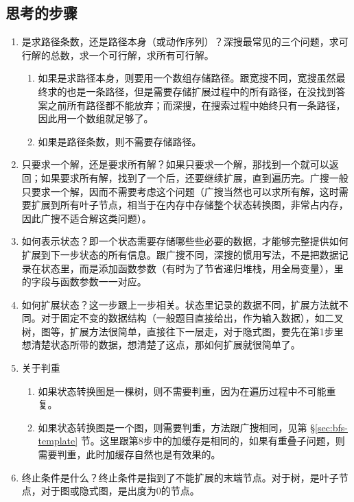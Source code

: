 \subsection{思考的步骤}
\begin{enumerate}
\item 是求路径条数，还是路径本身（或动作序列）？深搜最常见的三个问题，求可行解的总数，求一个可行解，求所有可行解。
    \begin{enumerate}
    \item 如果是求路径本身，则要用一个数组存储路径。跟宽搜不同，宽搜虽然最终求的也是一条路径，但是需要存储扩展过程中的所有路径，在没找到答案之前所有路径都不能放弃；而深搜，在搜索过程中始终只有一条路径，因此用一个数组就足够了。
    \item 如果是路径条数，则不需要存储路径。
    \end{enumerate}

\item 只要求一个解，还是要求所有解？如果只要求一个解，那找到一个就可以返回；如果要求所有解，找到了一个后，还要继续扩展，直到遍历完。广搜一般只要求一个解，因而不需要考虑这个问题（广搜当然也可以求所有解，这时需要扩展到所有叶子节点，相当于在内存中存储整个状态转换图，非常占内存，因此广搜不适合解这类问题）。

\item 如何表示状态？即一个状态需要存储哪些些必要的数据，才能够完整提供如何扩展到下一步状态的所有信息。跟广搜不同，深搜的惯用写法，不是把数据记录在状态里，而是添加函数参数（有时为了节省递归堆栈，用全局变量），里的字段与函数参数一一对应。

\item 如何扩展状态？这一步跟上一步相关。状态里记录的数据不同，扩展方法就不同。对于固定不变的数据结构（一般题目直接给出，作为输入数据），如二叉树，图等，扩展方法很简单，直接往下一层走，对于隐式图，要先在第1步里想清楚状态所带的数据，想清楚了这点，那如何扩展就很简单了。

\item 关于判重
    \begin{enumerate}
    \item 如果状态转换图是一棵树，则不需要判重，因为在遍历过程中不可能重复。
    \item 如果状态转换图是一个图，则需要判重，方法跟广搜相同，见第 \S \ref{sec:bfs-template} 节。这里跟第8步中的加缓存是相同的，如果有重叠子问题，则需要判重，此时加缓存自然也是有效果的。
    \end{enumerate}

\item 终止条件是什么？终止条件是指到了不能扩展的末端节点。对于树，是叶子节点，对于图或隐式图，是出度为0的节点。


\end{enumerate}
